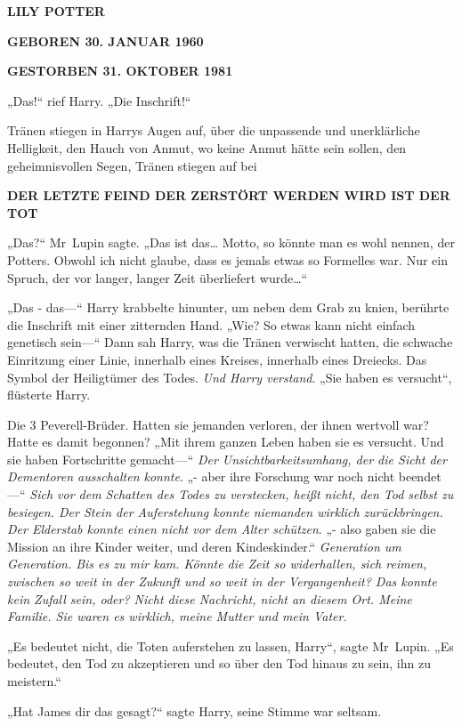 {\textbf{LILY POTTER}

\textbf{GEBOREN 30. JANUAR 1960}

\textbf{GESTORBEN 31. OKTOBER 1981}

„Das!“ rief Harry. „Die Inschrift!“

Tränen stiegen in Harrys Augen auf, über die unpassende und unerklärliche Helligkeit, den Hauch von Anmut, wo keine Anmut hätte sein sollen, den geheimnisvollen Segen, Tränen stiegen auf bei

\textbf{DER LETZTE FEIND DER ZERSTÖRT WERDEN WIRD IST DER TOT}

„Das?“ Mr~Lupin sagte. „Das ist das… Motto, so könnte man es wohl nennen, der Potters. Obwohl ich nicht glaube, dass es jemals etwas so Formelles war. Nur ein Spruch, der vor langer, langer Zeit überliefert wurde…“

„Das - das—“ Harry krabbelte hinunter, um neben dem Grab zu knien, berührte die Inschrift mit einer zitternden Hand. „Wie? So etwas kann nicht einfach genetisch sein—“ Dann sah Harry, was die Tränen verwischt hatten, die schwache Einritzung einer Linie, innerhalb eines Kreises, innerhalb eines Dreiecks. Das Symbol der Heiligtümer des Todes. \emph{Und Harry verstand}. „Sie haben es versucht“, flüsterte Harry.

Die 3 Peverell-Brüder. Hatten sie jemanden verloren, der ihnen wertvoll war? Hatte es damit begonnen? „Mit ihrem ganzen Leben haben sie es versucht. Und sie haben Fortschritte gemacht—“ \emph{Der Unsichtbarkeitsumhang, der die Sicht der Dementoren ausschalten konnte}. „- aber ihre Forschung war noch nicht beendet—“ \emph{Sich vor dem Schatten des Todes zu verstecken, heißt nicht, den Tod selbst zu besiegen. Der Stein der Auferstehung konnte niemanden wirklich zurückbringen. Der Elderstab konnte einen nicht vor dem Alter schützen}. „- also gaben sie die Mission an ihre Kinder weiter, und deren Kindeskinder.“ \emph{Generation um Generation. Bis es zu mir kam. Könnte die Zeit so widerhallen, sich reimen, zwischen so weit in der Zukunft und so weit in der Vergangenheit? Das konnte kein Zufall sein, oder? Nicht diese Nachricht, nicht an diesem Ort. Meine Familie. Sie waren es wirklich, meine Mutter und mein Vater.}

„Es bedeutet nicht, die Toten auferstehen zu lassen, Harry“, sagte Mr~Lupin. „Es bedeutet, den Tod zu akzeptieren und so über den Tod hinaus zu sein, ihn zu meistern.“

„Hat James dir das gesagt?“ sagte Harry, seine Stimme war seltsam.

}
